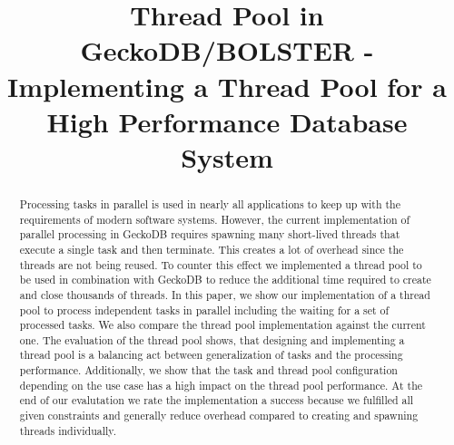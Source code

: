 \documentclass[conference]{IEEEtran}
\begin{document}


\title{Thread Pool in GeckoDB/BOLSTER - Implementing a Thread Pool for a High Performance Database System \\}

\author{
	 \and
}

\maketitle

\begin{abstract}
        Processing tasks in parallel is used in nearly all applications to keep
        up with the requirements of modern software systems. However, the
        current implementation of parallel processing in GeckoDB requires
        spawning many short-lived threads that execute a single task and then
        terminate. This creates a lot of overhead since the threads are not
        being reused. To counter this effect we implemented a thread pool to be
        used in combination with GeckoDB to reduce the additional time required
        to create and close thousands of threads. In this paper, we show our
        implementation of a thread pool to process independent tasks in parallel
        including the waiting for a set of processed tasks. We also compare the
        thread pool implementation against the current one. The evaluation of
        the thread pool shows, that designing and implementing a thread pool is
        a balancing act between generalization of tasks and the processing
        performance. Additionally, we show that the task and thread pool configuration
        depending on the use case has a high impact on the thread
        pool performance. At the end of our evalutation we rate the implementation a
        success because we fulfilled all given constraints and generally reduce
        overhead compared to creating and spawning threads individually.
\end{abstract}
\end{document}
